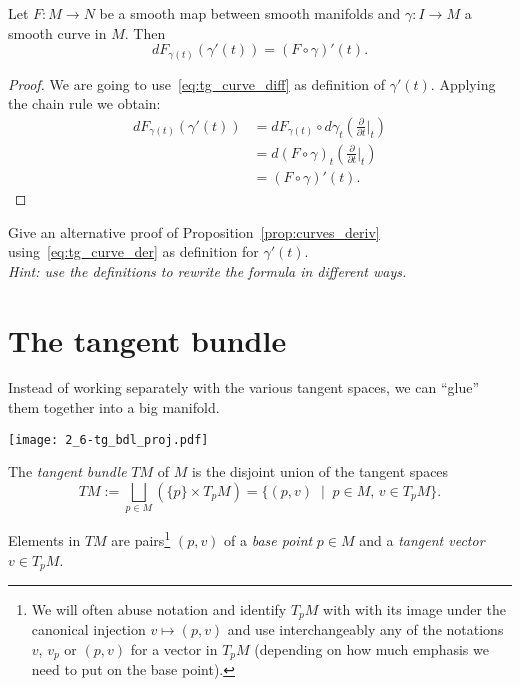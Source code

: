 \begin{proposition}\label{prop:curves_deriv}
  Let $F:M\to N$ be a smooth map between smooth manifolds and $\gamma:I\to M$ a smooth curve in $M$.
  Then
  \begin{equation}
    d F_{\gamma(t)} (\gamma'(t)) = (F\circ\gamma)'(t).
  \end{equation}
\end{proposition}
\begin{proof}
  We are going to use~\eqref{eq:tg_curve_diff} as definition of $\gamma'(t)$.
  Applying the chain rule we obtain:
  \begin{align}
    d F_{\gamma(t)} (\gamma'(t))
    &= d F_{\gamma(t)} \circ d\gamma_t\left(\frac{\partial}{\partial t}\Big|_t\right) \\
    &= d (F\circ\gamma)_t \left(\frac{\partial}{\partial t}\Big|_t\right) \\
    &= (F\circ\gamma)'(t).
  \end{align}
\end{proof}

\begin{exercise}
  Give an alternative proof of Proposition~\ref{prop:curves_deriv} using~\eqref{eq:tg_curve_der} as definition for $\gamma'(t)$.\\
 \textit{\small Hint: use the definitions to rewrite the formula in different ways.}
\end{exercise}

\section{The tangent bundle}\label{sec:tangentbundle}

Instead of working separately with the various tangent spaces, we can ``glue'' them together into a big manifold.

\begin{marginfigure}
  \texttt{[image: 2\_6-tg\_bdl\_proj.pdf]}
\end{marginfigure}
\begin{definition}
  The \emph{tangent bundle} $TM$ of $M$ is the disjoint union of the tangent spaces
  \begin{equation}
    TM := \bigsqcup_{p\in M}\left(\{p\}\times T_pM\right)
       = \{(p,v) \;\mid\; p\in M,\, v\in T_pM\}.
  \end{equation}  
\end{definition}

Elements in $TM$ are pairs\footnote{We will often abuse notation and identify $T_pM$ with with its image under the canonical injection $v\mapsto(p,v)$ and use interchangeably any of the notations $v$, $v_p$ or $(p,v)$ for a vector in $T_pM$ (depending on how much emphasis we need to put on the base point).} $(p,v)$ of a \emph{base point} $p\in M$ and a \emph{tangent vector} $v\in T_pM$.

